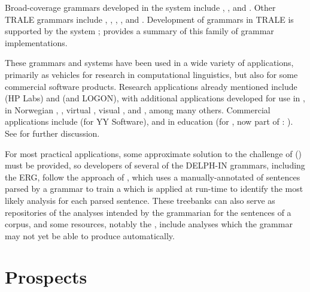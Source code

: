 \documentclass[output=paper
                ,modfonts
                ,nonflat
	        ,collection
	        ,collectionchapter
	        ,collectiontoclongg
 	        ,biblatex
                ,babelshorthands
                ,newtxmath
                ,draftmode
                ,colorlinks, citecolor=brown
]{./langsci/langscibook}
\begin{document}
Broad-coverage grammars developed in the  system \citep{MPR2002a-u,Penn2004a-u} include  \citep{MuellerLehrbuch1},  \citep{MOeDanish-language}, and  \citep{MuellerPersian}. Other TRALE grammars include
 \citep{ML2013a},  \citep{Abzianidze2011a-u},  \citep{MuellerMalteseSketch},  \citep{Machicao-y-Priemer2015a}, and  \citep{MOe2011a}. Development of grammars in TRALE is supported by the  system \citep{MuellerGrammix}; \citet{MuellerCoreGram} provides a summary of this family of grammar implementations.

These grammars and systems have been used in a wide variety of applications, primarily as vehicles for research in computational linguistics, but also for some commercial software products.  Research applications already mentioned include  (HP Labs) and  (\verbmobil and LOGON), with additional applications developed for use in  \citep*{Sch:Kie:Spu:11},  in Norwegian \citep*{Hellanetal:13},  \citep{Herb:Cope:06}, virtual  \citep{packard2014uw}, visual  \citep{DBLP:journals/corr/KuhnleC17}, and  \citep{Flickinger:17}, among many others.  Commercial applications include  (for YY Software), and  in education (for , now part of : \citealt*{Suppesetal:12}).  See  for further discussion.

For most practical applications, some approximate solution to the challenge of  () must be provided, so developers of several of the DELPH-IN grammars, including the ERG, follow the approach of \citet*{OFTM2004a-u}, which uses a manually-annotated  of sentences parsed by a grammar to train a  which is applied at run-time to identify the most likely analysis for each parsed sentence.  These treebanks can also serve as repositories of the analyses intended by the grammarian for the sentences of a corpus, and some resources, notably the  \citep*{BvNM2001a-u}, include analyses which the grammar may not yet be able to produce automatically.  

\section{Prospects}
\end{document}
